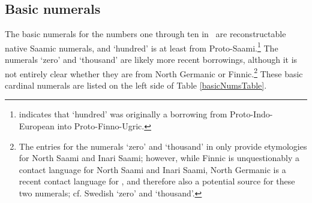 \subsection{Basic numerals}\label{basicNums}
The basic numerals for the numbers one through ten in \PS\ are reconstructable native Saamic numerals, and  ‘hundred’ is at least from Proto-Saami.\footnote{\citet[234-235]{Sammallahti1998} indicates that  ‘hundred’ was originally a borrowing from Proto-Indo-European into Proto-Finno-Ugric.} 
The numerals  ‘zero’ and  ‘thousand’ are likely more recent borrowings, although it is not entirely clear whether they are from North Germanic or Finnic.\footnote{The entries for the numerals ‘zero’ and ‘thousand’ in \citet{alguWebsite} only provide etymologies for North Saami and Inari Saami; however, while Finnic is unquestionably a contact language for North Saami and Inari Saami, North Germanic is a recent contact language for \PS, and therefore also a potential source for these two numerals; cf. Swedish  ‘zero’ and  ‘thousand’. } 
These basic cardinal numerals are listed on the left side of Table \vref{basicNumsTable}.
